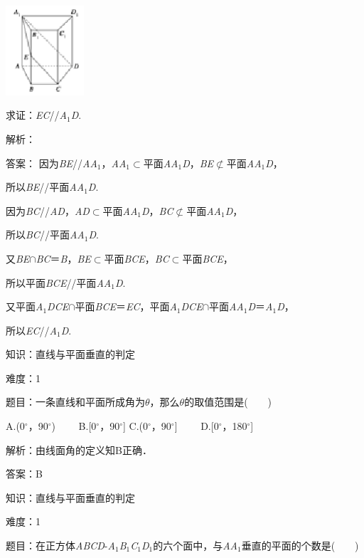 \documentclass{article} %
\begin{document}
\includegraphics*[width=1.15in, height=1.31in, keepaspectratio=false]{image192}

求证：\textit{EC}//\textit{A}${}_{1}$\textit{D}.

解析：

答案：
因为\textit{BE}//\textit{AA}${}_{1}$，\textit{AA}${}_{1}$$\mathrm{\subset }$平面\textit{AA}${}_{1}$\textit{D}，\textit{BE}$\mathrm{\nsubset}$平面\textit{AA}${}_{1}$\textit{D}，

所以\textit{BE}//平面\textit{AA}${}_{1}$\textit{D}.

因为\textit{BC}//\textit{AD}，\textit{AD}$\mathrm{\subset }$平面\textit{AA}${}_{1}$\textit{D}，\textit{BC}$\mathrm{\nsubset}$平面\textit{AA}${}_{1}$\textit{D}，

所以\textit{BC}//平面\textit{AA}${}_{1}$\textit{D}.

又\textit{BE}$\mathrm{\cap}$\textit{BC}＝\textit{B}，\textit{BE}$\mathrm{\subset }$平面\textit{BCE}，\textit{BC}$\mathrm{\subset }$平面\textit{BCE}，

所以平面\textit{BCE}//平面\textit{AA}${}_{1}$\textit{D}.

又平面\textit{A}${}_{1}$\textit{DCE}$\mathrm{\cap}$平面\textit{BCE}＝\textit{EC}，平面\textit{A}${}_{1}$\textit{DCE}$\mathrm{\cap}$平面\textit{AA}${}_{1}$\textit{D}＝\textit{A}${}_{1}$\textit{D}，

所以\textit{EC}//\textit{A}${}_{1}$\textit{D}.

知识：直线与平面垂直的判定

难度：1

题目：一条直线和平面所成角为\textit{$\theta$}，那么\textit{$\theta$}的取值范围是(　　)

A.(0$\mathrm{{}^\circ}$，90$\mathrm{{}^\circ}$)　　 B.[0$\mathrm{{}^\circ}$，90$\mathrm{{}^\circ}$] C.(0$\mathrm{{}^\circ}$，90$\mathrm{{}^\circ}$]　　 D.[0$\mathrm{{}^\circ}$，180$\mathrm{{}^\circ}$]

解析：由线面角的定义知B正确．

答案：B

知识：直线与平面垂直的判定

难度：1

题目：在正方体\textit{ABCD}-\textit{A}${}_{1}$\textit{B}${}_{1}$\textit{C}${}_{1}$\textit{D}${}_{1}$的六个面中，与\textit{AA}${}_{1}$垂直的平面的个数是(　　)
\end{document}
